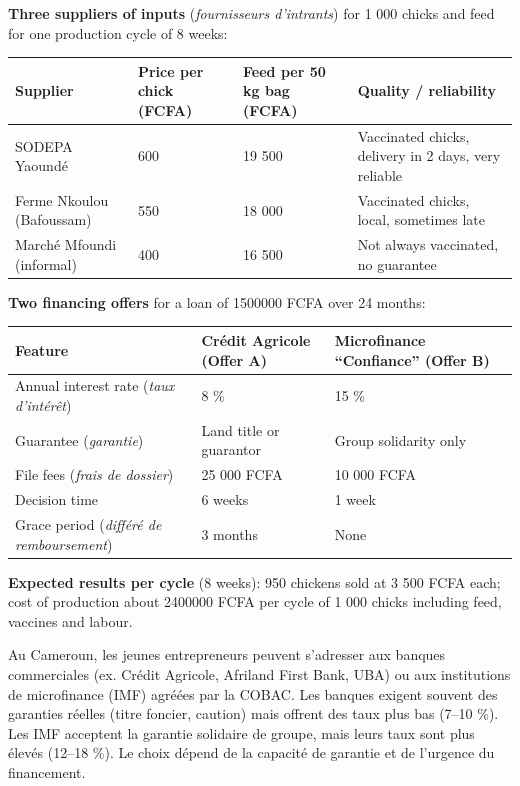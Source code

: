 \documentclass[11pt]{article}
\begin{document}
\textbf{Three suppliers of inputs} (\emph{fournisseurs d'intrants}) for 1 000 chicks and feed for one production cycle of 8 weeks:

\begin{center}
\begin{tabularx}{\linewidth}{|l|X|X|X|}\hline
\rowcolor{popblueL} \textbf{Supplier} & \textbf{Price per chick (FCFA)} & \textbf{Feed per 50 kg bag (FCFA)} & \textbf{Quality / reliability} \\ \hline
SODEPA Yaoundé & 600 & 19 500 & Vaccinated chicks, delivery in 2 days, very reliable \\ \hline
Ferme Nkoulou (Bafoussam) & 550 & 18 000 & Vaccinated chicks, local, sometimes late \\ \hline
Marché Mfoundi (informal) & 400 & 16 500 & Not always vaccinated, no guarantee \\ \hline
\end{tabularx}
\end{center}

\textbf{Two financing offers} for a loan of \num{1500000} FCFA over 24 months:

\begin{center}
\begin{tabularx}{\linewidth}{|l|X|X|}\hline
\rowcolor{popblueL} \textbf{Feature} & \textbf{Crédit Agricole (Offer A)} & \textbf{Microfinance ``Confiance'' (Offer B)} \\ \hline
Annual interest rate (\emph{taux d'intérêt}) & 8 \% & 15 \% \\ \hline
Guarantee (\emph{garantie}) & Land title or guarantor & Group solidarity only \\ \hline
File fees (\emph{frais de dossier}) & 25 000 FCFA & 10 000 FCFA \\ \hline
Decision time & 6 weeks & 1 week \\ \hline
Grace period (\emph{différé de remboursement}) & 3 months & None \\ \hline
\end{tabularx}
\end{center}

\textbf{Expected results per cycle} (8 weeks): 950 chickens sold at 3 500 FCFA each; cost of production about \num{2400000} FCFA per cycle of 1 000 chicks including feed, vaccines and labour.

\begin{savaistu}
Au Cameroun, les jeunes entrepreneurs peuvent s'adresser aux banques commerciales (ex. Crédit Agricole, Afriland First Bank, UBA) ou aux institutions de microfinance (IMF) agréées par la COBAC. Les banques exigent souvent des garanties réelles (titre foncier, caution) mais offrent des taux plus bas (7--10 \%). Les IMF acceptent la garantie solidaire de groupe, mais leurs taux sont plus élevés (12--18 \%). Le choix dépend de la capacité de garantie et de l'urgence du financement.
\end{savaistu}
\end{document}
